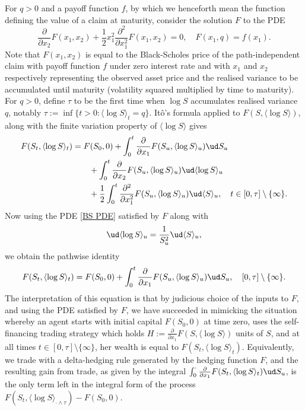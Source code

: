\documentclass[11pt]{article}
\begin{document}
For $q > 0$ and a payoff function $f$, by which we henceforth mean the function defining the value of a claim at maturity, consider the solution $F$ to the PDE
\begin{equation}
\label{BS PDE}
\frac{\partial}{\partial x_2}F(x_1,x_2) + \frac{1}{2} x_1^{2} \frac{\partial^2}{\partial x_1^2} F(x_1,x_2) = 0, \quad F(x_1,q)=f(x_1).
\end{equation}
Note that $F(x_1,x_2)$ is equal to the Black-Scholes price of the path-independent claim with payoff function $f$ under zero interest rate and with $x_1$ and $x_2$ respectively representing the observed asset price and the realised variance to be accumulated until maturity (volatility squared multiplied by time to maturity). For $q > 0$, define $\tau$ to be the first time when $\log S$ accumulates realised variance $q$, notably $\tau := \inf\{t>0: \langle \log S \rangle_{t} = q\}$. It\^o's formula applied to $F(S, \langle \log S \rangle)$, along with
the finite variation property of $\langle \log S \rangle$ gives
\begin{align*}
F(S_{t},\langle \log S \rangle_{t}) & =  F(S_{0},0) + \int_{0}^{t} \frac{\partial}{\partial x_1} F(S_{u},\langle \log S \rangle_{u}) \ud
S_u \\
&\quad \quad + \int_{0}^{t} \frac{\partial}{\partial x_2} F(S_{u},\langle \log S \rangle_{u})\ud \langle \log S \rangle_{u} \\
& \quad \quad + \frac{1}{2} \int_0^t \frac{\partial^2}{\partial x_1^2} F(S_u,\langle \log S \rangle_u) \ud \langle S \rangle_u, \quad t \in [0,\tau] \setminus \{ \infty \}.
\end{align*}
Now using the PDE \eqref{BS PDE} satisfied by $F$ along with
$$
\ud \langle \log S \rangle_u = \frac{1}{S_u^2} \ud \langle S \rangle_u,
$$
we obtain the pathwise identity
\begin{equation}
\label{example integral representation 1}
F(S_{t},\langle \log S \rangle_{t}) = F(S_{0},0) + \int_{0}^{t} \frac{\partial}{\partial x_1} F(S_{u},\langle \log S \rangle_{u})\ud
S_{u}, \quad [0,\tau] \setminus \{ \infty \}.   
\end{equation}
The interpretation of this equation is that by judicious choice of the
inputs to $F$, and using the PDE satisfied by $F$, we have succeeded in
mimicking the situation whereby an agent starts with initial capital
$F(S_{0},0)$ at time zero, uses the self-financing trading strategy which holds
$H := \frac{\partial}{\partial x_1} F(S,\langle \log S \rangle)$ units of $S$, and at
all times $t \in [0,\tau] \setminus \{ \infty \}$, her wealth is equal to $F(S_{t},\langle \log S \rangle_{t})$. Equivalently, we trade with a delta-hedging rule
generated by the hedging function $F$, and the resulting gain from trade, as given by the integral
$\int_{0}^{\cdot} \frac{\partial}{\partial x_1} F(S_t,\langle \log S \rangle_t)\ud S_{u}$, is the only term left in
the integral form of the process
$F(S_{t},\langle \log S \rangle_{\cdot \wedge \tau}) - F(S_0,0)$.
\end{document}
